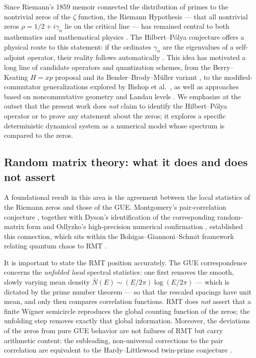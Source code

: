 \documentclass[11pt]{article}
\begin{document}
Since Riemann's 1859 memoir \cite{riemann1859} connected the distribution of primes to the nontrivial zeros of the $\zeta$ function, the Riemann Hypothesis --- that all nontrivial zeros $\rho = 1/2 + i\gamma_n$ lie on the critical line --- has remained central to both mathematics and mathematical physics \cite{titchmarsh1986,sarnak2000}. The Hilbert--P\'olya conjecture offers a physical route to this statement: if the ordinates $\gamma_n$ are the eigenvalues of a self-adjoint operator, their reality follows automatically \cite{schumayer2011}. This idea has motivated a long line of candidate operators and quantization schemes, from the Berry--Keating $H = xp$ proposal \cite{berry1999} and its Bender--Brody--M\"uller variant \cite{bender2017}, to the modified-commutator generalizations explored by Bishop et al.\ \cite{bishop2019}, as well as approaches based on noncommutative geometry \cite{connes1999} and Landau levels \cite{sierra2008}. We emphasize at the outset that the present work does \emph{not} claim to identify the Hilbert--P\'olya operator or to prove any statement about the zeros; it explores a specific deterministic dynamical system as a numerical model whose spectrum is compared to the zeros.

\subsection{Random matrix theory: what it does and does not assert}

A foundational result in this area is the agreement between the local statistics of the Riemann zeros and those of the GUE. Montgomery's pair-correlation conjecture \cite{montgomery1973}, together with Dyson's identification of the corresponding random-matrix form \cite{dyson1962} and Odlyzko's high-precision numerical confirmation \cite{odlyzko1987}, established this connection, which sits within the Bohigas--Giannoni--Schmit framework relating quantum chaos to RMT \cite{bohigas1984,gutzwiller1990}.

It is important to state the RMT position accurately. The GUE correspondence concerns the \emph{unfolded local} spectral statistics: one first removes the smooth, slowly varying mean density $\bar{N}(E)\sim (E/2\pi)\log(E/2\pi)$ \cite{weyl1911} --- which is dictated by the prime number theorem \cite{hadamard1896} --- so that the rescaled spacings have unit mean, and only then compares correlation functions. RMT does \emph{not} assert that a finite Wigner semicircle reproduces the global counting function of the zeros; the unfolding step removes exactly that global information. Moreover, the deviations of the zeros from pure GUE behavior are not failures of RMT but carry arithmetic content: the subleading, non-universal corrections to the pair correlation are equivalent to the Hardy--Littlewood twin-prime conjecture \cite{keating2019}.
\end{document}
